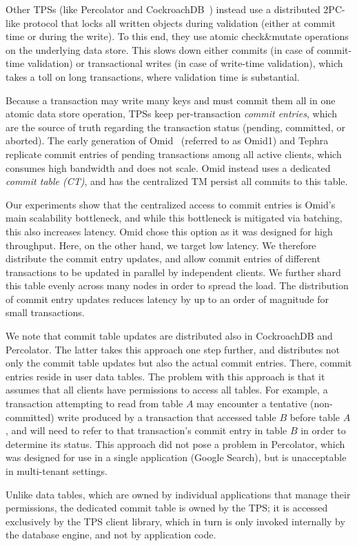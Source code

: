 Other TPSs (like Percolator and  CockroachDB~\cite{cockroach}) instead use a distributed 2PC-like protocol that locks all written objects during validation (either at commit time or during the write). To this end, they use atomic check\&mutate operations on the underlying data store. This slows down either commits (in case of commit-time validation) or transactional writes (in case of write-time validation), which takes a toll on long transactions, where validation time is substantial. 

%
Because a transaction may write many keys and must commit them all in one atomic data store operation,  
TPSs keep per-transaction \emph{commit entries}, which are the source of truth regarding the transaction status 
(pending, committed, or aborted). 
The early generation of Omid~\cite{OmidICDE2014} (referred to as Omid1) and Tephra replicate commit entries 
of pending transactions among all active clients, which consumes high bandwidth and does not scale. Omid 
instead uses a dedicated \emph{commit table (CT)}, and 
has the centralized TM persist all commits to this table. 

Our experiments show that the centralized access to commit entries is Omid's main scalability bottleneck, 
and while this bottleneck is mitigated via batching, this also increases latency.
Omid chose this  option as it was designed for high throughput. 
%
Here, on the other hand, we target  low latency. 
We therefore distribute the commit entry updates, and allow commit entries of different transactions to be 
updated in parallel by independent clients. 
We further shard this table evenly across many nodes in order to spread the load.
The distribution of commit entry updates reduces latency
by up to an order of magnitude for small transactions.



We note that commit table updates are distributed also in CockroachDB and Percolator. 
The latter takes this approach one step further, and distributes not only the commit table updates 
but also the actual commit entries. There, commit entries reside in user data tables.
The problem with this approach is that it assumes that all clients have permissions to access all 
tables. For example, a transaction attempting to read from  table $A$ may encounter a tentative (non-committed) write  
produced by a transaction that accessed table $B$ before table $A$, and will need to refer to 
that transaction's commit entry in table $B$ in order to determine its status. This approach 
did not pose a problem in Percolator, which was designed for use in a single application (Google Search), 
but is unacceptable in multi-tenant settings.   

Unlike data tables, which are owned by individual applications that manage their permissions,  
the dedicated commit table is owned by the TPS; it is accessed exclusively by the 
TPS client library, which in turn is only invoked   internally by the database engine, and not by application code. 




